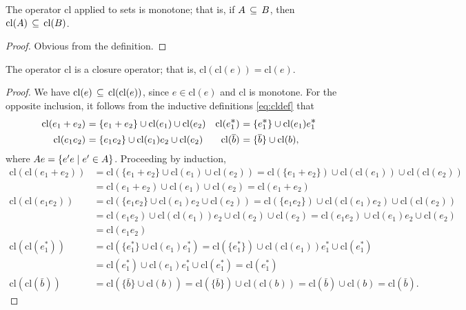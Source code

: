 \documentclass{article}
\renewcommand\star{^{\textstyle *}}
\newcommand\clname{\mathrm{cl}}
\newcommand\cl[1]{\clname(#1)}
\begin{document}
\begin{lemma}
The operator $\mathrm{cl}$ applied to sets is monotone; that is, if $A\,\subseteq\, B$, then $\cl A\subs\cl B$.
\end{lemma}
\begin{proof}
Obvious from the definition.
\end{proof}

\begin{lemma}
\label{eq:closure}
The operator $\clname$ is a closure operator; that is, $\cl{\cl e} = \cl e$.
\end{lemma}
\begin{proof}
We have $\cl e\subs\cl{\cl e}$, since $e\in\cl e$ and $\clname$ is monotone. For the opposite inclusion,
it follows from the inductive definitions \eqref{eq:cldef} that
\begin{equation}
\begin{array}{r@{\ }lr@{\ }l}
\cl{e_1+e_2} &= \{e_1+e_2\} \cup \cl{e_1} \cup \cl{e_2} & \cl{e_1\star} &= \{e_1\star\} \cup \cl{e_1}e_1\star\\[1ex]
\cl{e_1e_2} &= \{e_1e_2\} \cup \cl{e_1}e_2 \cup \cl{e_2} & \cl{\bar b} &= \{\bar b\} \cup \cl{b},
\end{array}
\label{eq:clprop}
\end{equation}
where $Ae = \{e'e \mid e'\in A\}$.
Proceeding by induction,
\begin{align*}
\cl{\cl{e_1+e_2}} &= \cl{\{e_1+e_2\} \cup \cl{e_1} \cup \cl{e_2}} = \cl{\{e_1+e_2\}} \cup \cl{\cl{e_1}} \cup \cl{\cl{e_2}}\\
&= \cl{e_1+e_2} \cup \cl{e_1} \cup \cl{e_2} = \cl{e_1+e_2}\\
\cl{\cl{e_1e_2}} &= \cl{\{e_1e_2\} \cup \cl{e_1}e_2 \cup \cl{e_2}} = \cl{\{e_1e_2\}} \cup \cl{\cl{e_1}e_2} \cup \cl{\cl{e_2}}\\
&= \cl{e_1e_2} \cup \cl{\cl{e_1}}e_2 \cup \cl{e_2} \cup \cl{e_2} = \cl{e_1e_2} \cup \cl{e_1}e_2 \cup \cl{e_2}\\
&= \cl{e_1e_2}\\
\cl{\cl{e_1\star}} &= \cl{\{e_1\star\} \cup \cl{e_1}e_1\star} = \cl{\{e_1\star\}} \cup \cl{\cl{e_1}}e_1\star \cup \cl{e_1\star}\\
&= \cl{e_1\star} \cup \cl{e_1}e_1\star \cup \cl{e_1\star} = \cl{e_1\star}\\
\cl{\cl{\bar b}} &= \cl{\{\bar b\} \cup \cl{b}} = \cl{\{\bar b\}} \cup \cl{\cl{b}} = \cl{\bar b} \cup \cl{b} = \cl{\bar b}.
\end{align*}
\end{proof}
\end{document}
